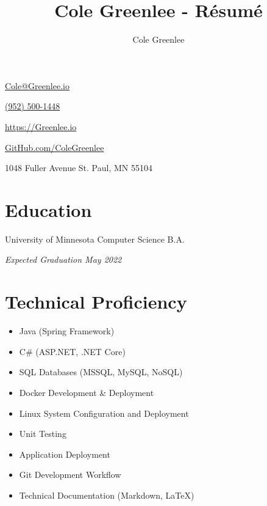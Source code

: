 \documentclass{article}
\title{Cole Greenlee - R\'esum\'e}
\author{Cole Greenlee}
\renewcommand{\maketitle}{
{\huge\bfseries\theauthor}
}
\begin{document}
\selectfont
\begin{multicols}{2}
\begin{description}
\item\maketitle
\item\href{mailto:Cole@Greenlee.io}{Cole@Greenlee.io}
\item\href{tel:+19525001448}{(952) 500-1448}
\item\href{https://Greenlee.io}{https://Greenlee.io}
\item\href{https://GitHub.com/ColeGreenlee/}{GitHub.com/ColeGreenlee}
\item 1048 Fuller Avenue St. Paul, MN 55104
\end{description}
\end{multicols}

\section{Education}
\vspace{-1.5em}
\begin{multicols}{2}
\begin{flushleft}
University of Minnesota Computer Science B.A.
\end{flushleft}
\begin{flushright}
\textit{Expected Graduation May 2022}
\end{flushright}
\end{multicols}

\section{Technical Proficiency}
\vspace{-1.5em}
\begin{multicols}{2}
\begin{itemize}[leftmargin=*]
	\item Java (Spring Framework)
	\item C\# (ASP.NET, .NET Core)
	\item SQL Databases (MSSQL, MySQL, NoSQL)
	\item Docker Development \& Deployment
	\item Linux System Configuration and Deployment
	\item Unit Testing
	\item Application Deployment
	\item Git Development Workflow
	\item Technical Documentation (Markdown, LaTeX)
\end{itemize}
\end{multicols}
\end{document}
